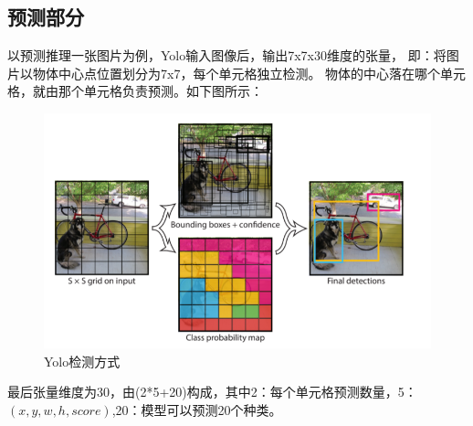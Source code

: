 \subsection{预测部分}
\par
以预测推理一张图片为例，Yolo输入图像后，输出7x7x30维度的张量，
即：将图片以物体中心点位置划分为7x7，每个单元格独立检测。
物体的中心落在哪个单元格，就由那个单元格负责预测。如下图所示：
\begin{figure}[H]
	\centering
	\setlength{\abovecaptionskip}{0cm}  
	\setlength{\belowcaptionskip}{0cm}  
	\includegraphics[width=1\textwidth]{figures/yologrid.png}
	\caption{Yolo检测方式}
\end{figure}
\par
最后张量维度为30，由(2*5+20)构成，其中2：每个单元格预测数量，5：$(x,y,w,h,score)$,20：模型可以预测20个种类。